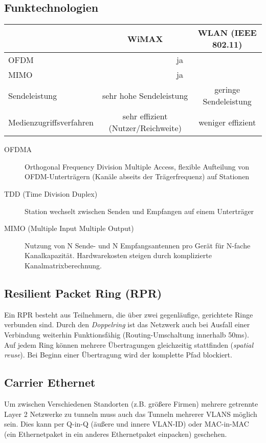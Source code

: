 \documentclass[a4paper]{article}
\begin{document}
\subsection{Funktechnologien}
\begin{tabular}{l|c|c}
    & WiMAX & WLAN (IEEE 802.11) \\ \hline
    OFDM & \multicolumn{2}{c}{ja} \\
    MIMO & \multicolumn{2}{c}{ja} \\
    Sendeleistung & sehr hohe Sendeleistung & geringe Sendeleistung \\
    Medienzugriffsverfahren & sehr effizient  (Nutzer/Reichweite) & weniger effizient
\end{tabular}

\begin{description}
    \item[OFDMA]  Orthogonal Frequency Division Multiple Access, flexible Aufteilung von OFDM-Unterträgern (Kanäle abseits der Trägerfrequenz) auf Stationen 
    \item[TDD (Time Division Duplex)] Station wechselt zwischen Senden und Empfangen auf einem Unterträger
    \item[MIMO (Multiple Input Multiple Output)] Nutzung von N Sende- und N Empfangsantennen pro Gerät für N-fache Kanalkapazität. Hardwarekosten steigen durch komplizierte Kanalmatrixberechnung.
\end{description}

\subsection{Resilient Packet Ring (RPR)}
Ein RPR besteht aus Teilnehmern, die über zwei gegenläufige, gerichtete Ringe verbunden sind. Durch den \textit{Doppelring} ist das Netzwerk auch bei Ausfall einer Verbindung weiterhin Funktionsfähig (Routing-Umschaltung innerhalb 50ms). Auf jedem Ring können mehrere Übertragungen gleichzeitig stattfinden (\textit{spatial reuse}). Bei Beginn einer Übertragung wird der komplette Pfad blockiert.

\subsection{Carrier Ethernet}
Um zwischen Verschiedenen Standorten (z.B. größere Firmen) mehrere getrennte Layer 2 Netzwerke zu tunneln muss auch das Tunneln mehrerer VLANS möglich sein. Dies kann per Q-in-Q (äußere und innere VLAN-ID) oder MAC-in-MAC (ein Ethernetpaket in ein anderes Ethernetpaket einpacken) geschehen.
\end{document}
